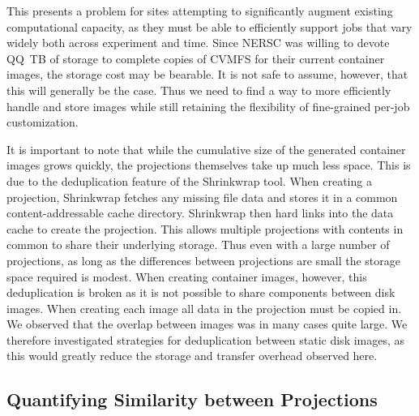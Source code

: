 \documentclass[conference]{IEEEtran}
\begin{document}
This presents a problem for sites attempting to significantly augment existing computational capacity,
as they must be able to efficiently support jobs that vary widely both across experiment and time.
Since NERSC was willing to devote QQ~TB of storage to complete copies of CVMFS for their current container images,
the storage cost may be bearable.
It is not safe to assume,
however, that this will generally be the case.
Thus we need to find a way to more efficiently handle and store images while still retaining the flexibility of fine-grained per-job customization.

It is important to note that while the cumulative size of the generated container images grows quickly,
the projections themselves take up much less space.
This is due to the deduplication feature of the Shrinkwrap tool.
When creating a projection,
Shrinkwrap fetches any missing file data and stores it in a common content-addressable cache directory.
Shrinkwrap then hard links into the data cache to create the projection.
This allows multiple projections with contents in common to share their underlying storage.
Thus even with a large number of projections,
as long as the differences between projections are small the storage space required is modest.
When creating container images,
however, this deduplication is broken as it is not possible to share components between disk images.
When creating each image all data in the projection must be copied in.
We observed that the overlap between images was in many cases quite large.
We therefore investigated strategies for deduplication between static disk images,
as this would greatly reduce the storage and transfer overhead observed here.

\subsection{Quantifying Similarity between Projections}
\end{document}
